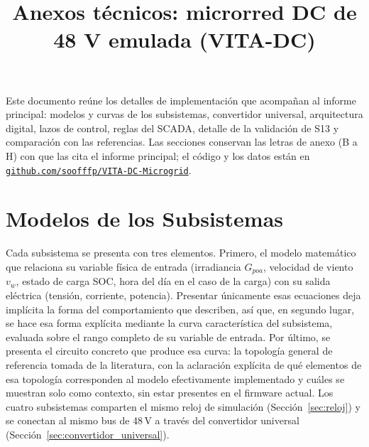 \documentclass[conference]{IEEEtran}
\begin{document}
\title{Anexos técnicos: microrred DC de 48 V emulada (VITA-DC)\\
}

\author{
\and
{}
}

\maketitle

Este documento reúne los detalles de implementación que acompañan al informe principal: modelos y curvas de los subsistemas, convertidor universal, arquitectura digital, lazos de control, reglas del SCADA, detalle de la validación de S13 y comparación con las referencias. Las secciones conservan las letras de anexo (B a H) con que las cita el informe principal; el código y los datos están en \texttt{\href{https://github.com/soofffp/VITA-DC-Microgrid}{\texttt{github.com/soofffp/VITA-DC-Microgrid}}}.

\appendices
\setcounter{section}{1}

\section{Modelos de los Subsistemas}
\label{app:modelos}
\label{sec:subsistemas}
\label{sec:caracterizacion}
\label{sec:circuitos}

Cada subsistema se presenta con tres elementos. Primero, el modelo matemático que relaciona su variable física de entrada (irradiancia $G_{poa}$, velocidad de viento $v_w$, estado de carga SOC, hora del día en el caso de la carga) con su salida eléctrica (tensión, corriente, potencia). Presentar únicamente esas ecuaciones deja implícita la forma del comportamiento que describen, así que, en segundo lugar, se hace esa forma explícita mediante la curva característica del subsistema, evaluada sobre el rango completo de su variable de entrada. Por último, se presenta el circuito concreto que produce esa curva: la topología general de referencia tomada de la literatura, con la aclaración explícita de qué elementos de esa topología corresponden al modelo efectivamente implementado y cuáles se muestran solo como contexto, sin estar presentes en el firmware actual. Los cuatro subsistemas comparten el mismo reloj de simulación (Sección~\ref{sec:reloj}) y se conectan al mismo bus de 48\,V a través del convertidor universal (Sección~\ref{sec:convertidor_universal}).
\end{document}
